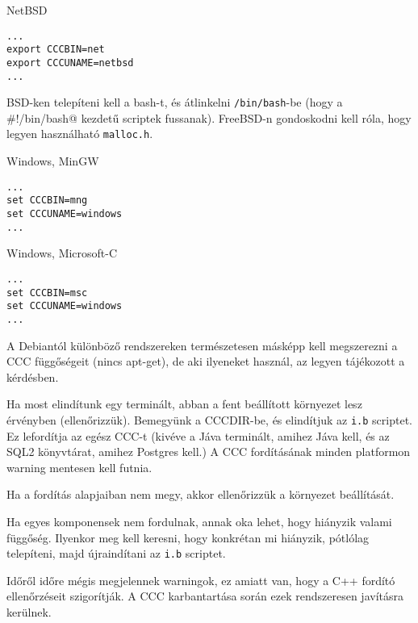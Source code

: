 NetBSD
\begin{verbatim}
...
export CCCBIN=net
export CCCUNAME=netbsd
...
\end{verbatim}

BSD-ken telepíteni kell a bash-t, és átlinkelni \verb!/bin/bash!-be (hogy a
\verb@#!/bin/bash@ kezdetű scriptek fussanak). FreeBSD-n gondoskodni kell róla,
hogy legyen használható \verb!malloc.h!.


Windows, MinGW
\begin{verbatim}
...
set CCCBIN=mng
set CCCUNAME=windows
...
\end{verbatim}

Windows, Microsoft-C
\begin{verbatim}
...
set CCCBIN=msc
set CCCUNAME=windows
...
\end{verbatim}

A Debiantól különböző rendszereken természetesen másképp kell megszerezni
a CCC függőségeit (nincs apt-get), de aki ilyeneket használ, 
az legyen tájékozott a kérdésben.

Ha most elindítunk egy terminált, abban a fent beállított környezet lesz érvényben
(ellenőrizzük). Bemegyünk a CCCDIR-be, és elindítjuk az \verb!i.b! scriptet. 
Ez lefordítja az egész CCC-t (kivéve a Jáva terminált, amihez Jáva kell, 
és az SQL2 könyvtárat, amihez Postgres kell.) 
A CCC fordításának minden platformon warning mentesen kell futnia.

Ha a fordítás alapjaiban nem megy, akkor ellenőrizzük a környezet beállítását.

Ha egyes komponensek nem fordulnak, annak oka lehet, hogy hiányzik valami
függőség. Ilyenkor meg kell keresni, hogy konkrétan mi hiányzik, pótlólag telepíteni,
majd újraindítani az \verb!i.b! scriptet.

Időről időre mégis megjelennek warningok, ez amiatt van, hogy a C++ fordító 
ellenőrzéseit szigorítják. A CCC karbantartása során ezek rendszeresen javításra 
kerülnek.


